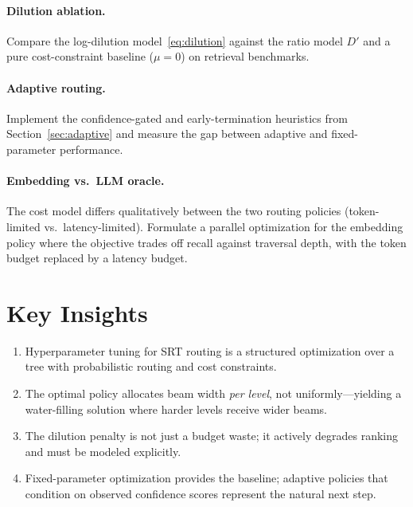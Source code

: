 \documentclass[11pt]{article}
\theoremstyle{plain}
\begin{document}
\paragraph{Dilution ablation.}
Compare the log-dilution model~\eqref{eq:dilution} against the
ratio model $D'$ and a pure cost-constraint baseline ($\mu = 0$) on
retrieval benchmarks.

\paragraph{Adaptive routing.}
Implement the confidence-gated and early-termination heuristics from
Section~\ref{sec:adaptive} and measure the gap between adaptive and
fixed-parameter performance.

\paragraph{Embedding vs.\ LLM oracle.}
The cost model differs qualitatively between the two routing policies
(token-limited vs.\ latency-limited).  Formulate a parallel
optimization for the embedding policy where the objective trades off
recall against traversal depth, with the token budget replaced by a
latency budget.

\section{Key Insights}

\begin{enumerate}[nosep]
  \item Hyperparameter tuning for SRT routing is a structured
    optimization over a tree with probabilistic routing and cost
    constraints.
  \item The optimal policy allocates beam width \emph{per level},
    not uniformly---yielding a water-filling solution where harder
    levels receive wider beams.
  \item The dilution penalty is not just a budget waste; it actively
    degrades ranking and must be modeled explicitly.
  \item Fixed-parameter optimization provides the baseline;
    adaptive policies that condition on observed confidence scores
    represent the natural next step.
\end{enumerate}
\end{document}
